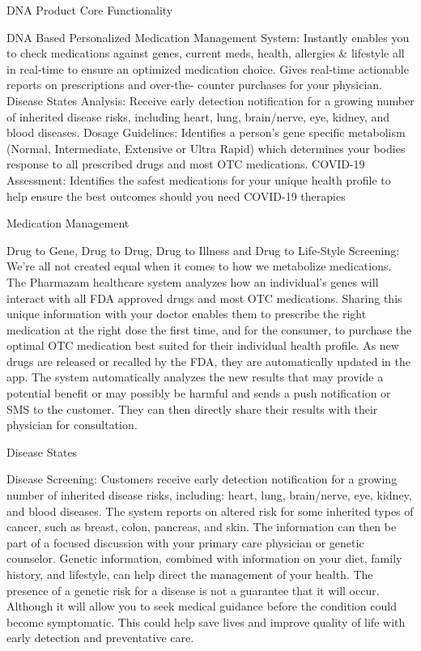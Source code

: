\documentclass[11pt]{article}
\begin{document}
DNA Product Core Functionality


DNA Based Personalized Medication Management System: Instantly enables you to check medications against genes, current meds, health, allergies \& lifestyle all in real-time to ensure an optimized medication choice. Gives real-time actionable reports on prescriptions and over-the- counter purchases for your physician. Disease States Analysis: Receive early detection notification for a growing number of inherited disease risks, including heart, lung, brain/nerve, eye, kidney, and blood diseases. Dosage Guidelines: Identifies a person's gene specific metabolism (Normal, Intermediate, Extensive or Ultra Rapid) which determines your bodies response to all prescribed drugs and most OTC medications. COVID-19 Assessment: Identifies the safest medications for your unique health profile to help ensure the best outcomes should you need COVID-19 therapies


Medication Management


Drug to Gene, Drug to Drug, Drug to Illness and Drug to Life-Style Screening: We're all not created equal when it comes to how we metabolize medications. The Pharmazam healthcare system analyzes how an individual's genes will interact with all FDA approved drugs and most OTC medications. Sharing this unique information with your doctor enables them to prescribe the right medication at the right dose the first time, and for the consumer, to purchase the optimal OTC medication best suited for their individual health profile. As new drugs are released or recalled by the FDA, they are automatically updated in the app. The system automatically analyzes the new results that may provide a potential benefit or may possibly be harmful and sends a push notification or SMS to the customer. They can then directly share their results with their physician for consultation.


Disease States


Disease Screening: Customers receive early detection notification for a growing number of inherited disease risks, including: heart, lung, brain/nerve, eye, kidney, and blood diseases. The system reports on altered risk for some inherited types of cancer, such as breast, colon, pancreas, and skin. The information can then be part of a focused discussion with your primary care physician or genetic counselor. Genetic information, combined with information on your diet, family history, and lifestyle, can help direct the management of your health. The presence of a genetic risk for a disease is not a guarantee that it will occur. Although it will allow you to seek medical guidance before the condition could become symptomatic. This could help save lives and improve quality of life with early detection and preventative care.
\end{document}

